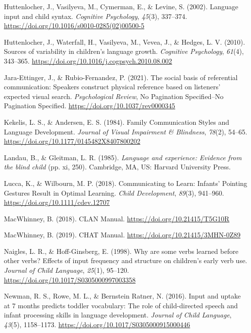 \documentclass[english,man]{apa6}
\begin{document}
\leavevmode\hypertarget{ref-huttenlocher2002}{}%
Huttenlocher, J., Vasilyeva, M., Cymerman, E., \& Levine, S. (2002). Language input and child syntax. \emph{Cognitive Psychology}, \emph{45}(3), 337--374. \url{https://doi.org/10.1016/s0010-0285(02)00500-5}

\leavevmode\hypertarget{ref-huttenlocher2010}{}%
Huttenlocher, J., Waterfall, H., Vasilyeva, M., Vevea, J., \& Hedges, L. V. (2010). Sources of variability in children's language growth. \emph{Cognitive Psychology}, \emph{61}(4), 343--365. \url{https://doi.org/10.1016/j.cogpsych.2010.08.002}

\leavevmode\hypertarget{ref-jara-ettinger2021}{}%
Jara-Ettinger, J., \& Rubio-Fernandez, P. (2021). The social basis of referential communication: Speakers construct physical reference based on listeners' expected visual search. \emph{Psychological Review}, No Pagination Specified--No Pagination Specified. \url{https://doi.org/10.1037/rev0000345}

\leavevmode\hypertarget{ref-kekelis1984}{}%
Kekelis, L. S., \& Andersen, E. S. (1984). Family Communication Styles and Language Development. \emph{Journal of Visual Impairment \& Blindness}, \emph{78}(2), 54--65. \url{https://doi.org/10.1177/0145482X8407800202}

\leavevmode\hypertarget{ref-landau1985}{}%
Landau, B., \& Gleitman, L. R. (1985). \emph{Language and experience: Evidence from the blind child} (pp. xi, 250). Cambridge, MA, US: Harvard University Press.

\leavevmode\hypertarget{ref-lucca2018}{}%
Lucca, K., \& Wilbourn, M. P. (2018). Communicating to Learn: Infants' Pointing Gestures Result in Optimal Learning. \emph{Child Development}, \emph{89}(3), 941--960. \url{https://doi.org/10.1111/cdev.12707}

\leavevmode\hypertarget{ref-macwhinney2018}{}%
MacWhinney, B. (2018). CLAN Manual. \url{https://doi.org/10.21415/T5G10R}

\leavevmode\hypertarget{ref-macwhinney2019}{}%
MacWhinney, B. (2019). CHAT Manual. \url{https://doi.org/10.21415/3MHN-0Z89}

\leavevmode\hypertarget{ref-naigles1998}{}%
Naigles, L. R., \& Hoff-Ginsberg, E. (1998). Why are some verbs learned before other verbs? Effects of input frequency and structure on children's early verb use. \emph{Journal of Child Language}, \emph{25}(1), 95--120. \url{https://doi.org/10.1017/S0305000997003358}

\leavevmode\hypertarget{ref-newman2016}{}%
Newman, R. S., Rowe, M. L., \& Bernstein Ratner, N. (2016). Input and uptake at 7 months predicts toddler vocabulary: The role of child-directed speech and infant processing skills in language development. \emph{Journal of Child Language}, \emph{43}(5), 1158--1173. \url{https://doi.org/10.1017/S0305000915000446}
\end{document}
